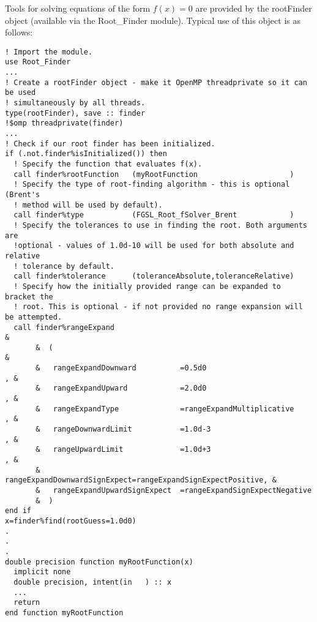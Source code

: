 Tools for solving equations of the form $f(x)=0$ are provided by the {\normalfont \ttfamily rootFinder} object (available via the {\normalfont \ttfamily Root\_Finder} module). Typical use of this object is as follows:
\begin{lstlisting}
! Import the module.
use Root_Finder
...
! Create a rootFinder object - make it OpenMP threadprivate so it can be used
! simultaneously by all threads.
type(rootFinder), save :: finder
!$omp threadprivate(finder)                                                                                                      
...
! Check if our root finder has been initialized.
if (.not.finder%isInitialized()) then
  ! Specify the function that evaluates f(x).
  call finder%rootFunction   (myRootFunction                     )
  ! Specify the type of root-finding algorithm - this is optional (Brent's
  ! method will be used by default).
  call finder%type           (FGSL_Root_fSolver_Brent            )
  ! Specify the tolerances to use in finding the root. Both arguments are
  !optional - values of 1.0d-10 will be used for both absolute and relative
  ! tolerance by default.
  call finder%tolerance      (toleranceAbsolute,toleranceRelative)
  ! Specify how the initially provided range can be expanded to bracket the
  ! root. This is optional - if not provided no range expansion will be attempted.
  call finder%rangeExpand                                               & 
       &  (                                                             &
       &   rangeExpandDownward          =0.5d0                        , &
       &   rangeExpandUpward            =2.0d0                        , &
       &   rangeExpandType              =rangeExpandMultiplicative    , &
       &   rangeDownwardLimit           =1.0d-3                       , &
       &   rangeUpwardLimit             =1.0d+3                       , &
       &   rangeExpandDownwardSignExpect=rangeExpandSignExpectPositive, &
       &   rangeExpandUpwardSignExpect  =rangeExpandSignExpectNegative
       &  )
end if
x=finder%find(rootGuess=1.0d0)
.
.
.
double precision function myRootFunction(x)
  implicit none
  double precision, intent(in   ) :: x
  ...
  return
end function myRootFunction
\end{lstlisting}
